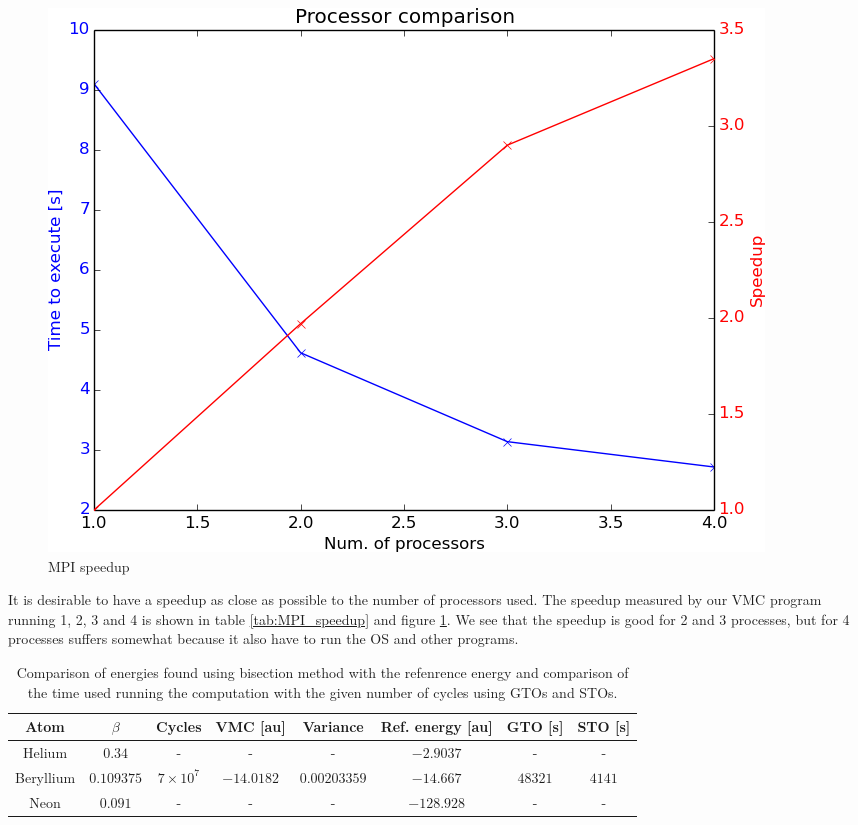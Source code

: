 		\begin{figure}
			\centering \includegraphics[width=0.45\linewidth]{../figures/processor_number_time_comparison}
			\protect\caption{MPI speedup}
			\label{fig:MPI_speedup}
		\end{figure}

		It is desirable to have a speedup as close as possible to the number of processors used. The speedup measured by our VMC program running 1, 2, 3 and 4 is shown in table \ref{tab:MPI_speedup} and figure \ref{fig:MPI_speedup}. We see that the speedup is good for 2 and 3 processes, but for 4 processes suffers somewhat because it also have to run the OS and other programs.


		\begin{table}
			\center %
			\begin{tabular}{|c|c|c|c|c|c|c|c|}
				\hline 
				Atom  & $\beta$ & Cycles & VMC {[}au{]} & Variance & Ref. energy {[}au{]} & GTO [s] & STO [s] \tabularnewline
				\hline 
				Helium &  $0.34$ & - & - & - & $-2.9037$ & - & - \tabularnewline
				\hline 
				Beryllium  &  $0.109375$ & $7\times 10^{7}$ & $-14.0182$ & $0.00203359$ & $-14.667$ & $48321$ & $4141$ \tabularnewline
				\hline 
				Neon  & $0.091$ & - & - & - & $-128.928$ & - & - \tabularnewline
				\hline 
			\end{tabular}\protect\caption{ Comparison of energies found using bisection method with the refenrence energy \parencite{Koput_2011_PCCP} \parencite{Binkley_1975} and comparison of the time used running the computation with the given number of cycles using GTOs and STOs.}
			\label{tab:AtomsGTO} 
		\end{table}
